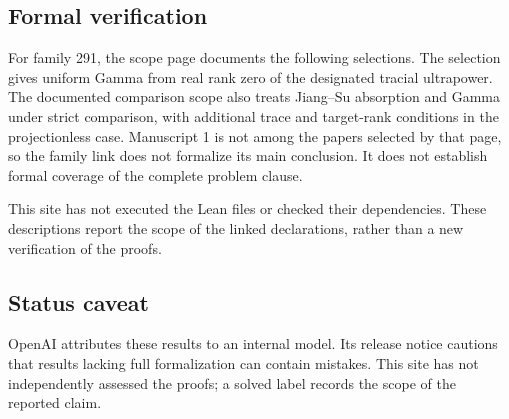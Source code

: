 \documentclass[11pt]{article}
\begin{document}
\subsection{Formal verification}
For family 291, the scope page documents the following selections. The selection gives uniform Gamma from real rank zero of the designated tracial ultrapower. The documented comparison scope also treats Jiang--Su absorption and Gamma under strict comparison, with additional trace and target-rank conditions in the projectionless case. Manuscript 1 is not among the papers selected by that page, so the family link does not formalize its main conclusion. It does not establish formal coverage of the complete problem clause.

This site has not executed the Lean files or checked their dependencies. These descriptions report the scope of the linked declarations, rather than a new verification of the proofs.

\subsection{Status caveat}
OpenAI attributes these results to an internal model. Its release notice cautions that results lacking full formalization can contain mistakes. This site has not independently assessed the proofs; a solved label records the scope of the reported claim.
\end{document}
